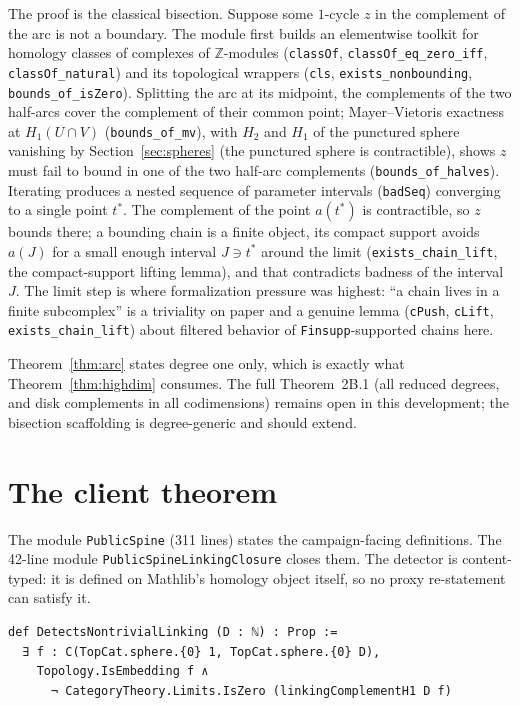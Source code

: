 \documentclass[11pt]{article}
\theoremstyle{remark}
\newcommand{\Z}{\mathbb{Z}}
\newcommand{\leanname}[1]{\texttt{#1}}
\begin{document}
The proof is the classical bisection. Suppose some $1$-cycle $z$ in the
complement of the arc is not a boundary. The module first builds an
elementwise toolkit for homology classes of complexes of $\Z$-modules
(\leanname{classOf}, \leanname{classOf\_eq\_zero\_iff},
\leanname{classOf\_natural}) and its topological wrappers
(\leanname{cls}, \leanname{exists\_nonbounding},
\leanname{bounds\_of\_isZero}). Splitting the arc at its midpoint, the
complements of the two half-arcs cover the complement of their common point;
Mayer--Vietoris exactness at $H_1(U \cap V)$
(\leanname{bounds\_of\_mv}), with $H_2$ and $H_1$ of the punctured sphere
vanishing by Section~\ref{sec:spheres} (the punctured sphere is
contractible), shows $z$ must fail to bound in one of the two half-arc
complements (\leanname{bounds\_of\_halves}). Iterating produces a nested
sequence of parameter intervals (\leanname{badSeq}) converging to a single
point $t^*$. The complement of the point $a(t^*)$ is contractible, so $z$
bounds there; a bounding chain is a finite object, its compact support
avoids $a(J)$ for a small enough interval $J \ni t^*$ around the limit
(\leanname{exists\_chain\_lift}, the compact-support lifting lemma), and
that contradicts badness of the interval $J$. The limit step is where
formalization pressure was highest: ``a chain lives in a finite subcomplex''
is a triviality on paper and a genuine lemma
(\leanname{cPush}, \leanname{cLift}, \leanname{exists\_chain\_lift}) about
filtered behavior of \leanname{Finsupp}-supported chains here.

Theorem~\ref{thm:arc} states degree one only, which is exactly what
Theorem~\ref{thm:highdim} consumes. The full Theorem~2B.1 (all reduced
degrees, and disk complements in all codimensions) remains open in this
development; the bisection scaffolding is degree-generic and should extend.

\section{The client theorem}\label{sec:client}

The module \leanname{PublicSpine} (311 lines) states the campaign-facing
definitions. The 42-line module \leanname{PublicSpineLinkingClosure}
closes them. The detector is content-typed: it is defined on Mathlib's homology
object itself, so no proxy re-statement can satisfy it.

\begin{lstlisting}
def DetectsNontrivialLinking (D : ℕ) : Prop :=
  ∃ f : C(TopCat.sphere.{0} 1, TopCat.sphere.{0} D),
    Topology.IsEmbedding f ∧
      ¬ CategoryTheory.Limits.IsZero (linkingComplementH1 D f)
\end{lstlisting}
\end{document}
